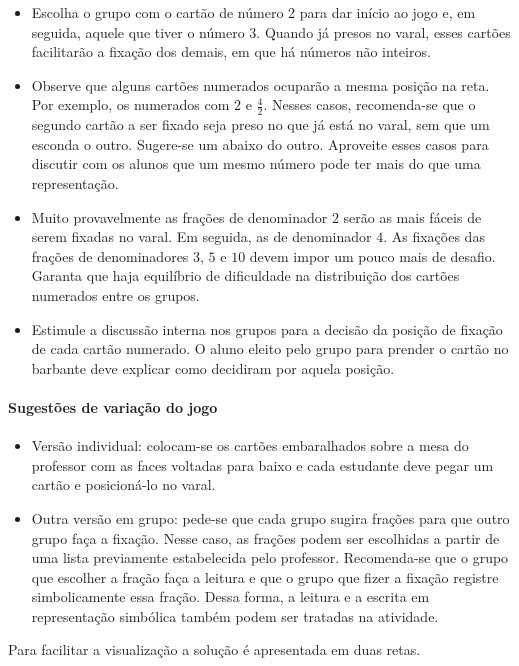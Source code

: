 \begin{atividade}
\begin{itemize}
  \item Escolha o grupo com o cartão de número 2  para dar início ao jogo e, em seguida, aquele que tiver o número 3.  Quando já presos no varal, esses cartões facilitarão a fixação dos demais, em que há números não inteiros.
  \item Observe que alguns cartões numerados ocuparão a mesma posição na reta. Por exemplo, os numerados com $2$ e $\frac{4}{2}$. Nesses casos, recomenda-se que o segundo cartão a ser fixado seja preso no que já está no varal, sem que um esconda o outro. Sugere-se um abaixo do outro. Aproveite esses casos para discutir com os alunos que um mesmo número pode ter mais do que uma representação.
  \item Muito provavelmente as frações de denominador $2$ serão as mais fáceis de serem fixadas no varal. Em seguida, as de denominador $4$. As fixações das frações de denominadores $3$, $5$ e $10$ devem impor um pouco mais de desafio. Garanta que haja equilíbrio de dificuldade na distribuição dos cartões numerados entre os grupos.
  \item Estimule a discussão interna nos grupos para a decisão da posição de fixação de cada cartão numerado. O aluno eleito pelo grupo para prender o cartão no barbante deve explicar como decidiram por aquela posição.
  \end{itemize}

\paragraph{Sugestões de variação do jogo}
\begin{itemize}  
  \item Versão individual: colocam-se os cartões embaralhados sobre a mesa do professor com as faces voltadas para baixo e cada estudante deve pegar um cartão e posicioná-lo no varal.
  \item Outra versão em grupo: pede-se que cada grupo sugira frações para que outro grupo faça a fixação. Nesse caso, as frações podem ser escolhidas a partir de uma lista previamente estabelecida pelo professor. Recomenda-se que o grupo que escolher a fração faça a leitura e que o grupo que fizer a fixação registre simbolicamente essa fração. Dessa forma, a leitura e a escrita em representação simbólica também podem ser tratadas na atividade.
\end{itemize} %

\solucao
Para facilitar a visualização a solução é apresentada em duas retas.
  \begin{center}
\end{center}
\end{atividade}
